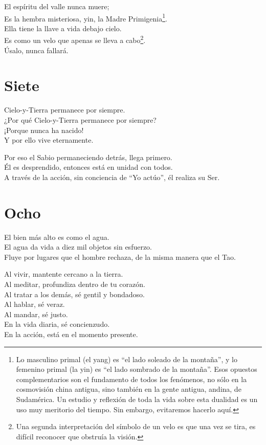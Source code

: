 \documentclass[book,b5paper,hidelinks,final]{memoir}
\begin{document}
	El espíritu del valle nunca muere;\\
	Es la hembra misteriosa, yin, la Madre Primigenia\footnote{Lo masculino primal (el yang) es ``el lado soleado de la montaña'', y lo
		femenino primal (la yin) es ``el lado sombrado de la montaña''. Esos
		opuestos complementarios son el fundamento de todos los fenómenos, no
		sólo en la cosmovisión china antigua, sino también en la gente antigua,
		andina, de Sudamérica. Un estudio y reflexión de toda la vida sobre esta
		dualidad es un uso muy meritorio del tiempo. Sin embargo, evitaremos
		hacerlo aquí.}.\\
	Ella tiene la llave a vida debajo cielo.\\
	Es como un velo que apenas se lleva a cabo\footnote{Una segunda interpretación del símbolo de un velo es que una vez se tira, es difícil reconocer que obstruía la visión.}.\\
	Úsalo, nunca fallará.
	
	\chapter*{Siete}
	
	Cielo-y-Tierra permanece por siempre.\\
	¿Por qué Cielo-y-Tierra permanece por siempre?\\
	¡Porque nunca ha nacido!\\
	Y por ello vive eternamente.
	
	Por eso el Sabio permaneciendo detrás, llega primero.\\
	Él es desprendido, entonces está en unidad con todos.\\
	A través de la acción, sin conciencia de ``Yo actúo'', él realiza su
	Ser.
	
	\chapter*{Ocho}
	
	El bien más alto es como el agua.\\
	El agua da vida a diez mil objetos sin esfuerzo.\\
	Fluye por lugares que el hombre rechaza, de la misma manera que el Tao.
	
	Al vivir, mantente cercano a la tierra.\\
	Al meditar, profundiza dentro de tu corazón.\\
	Al tratar a los demás, sé gentil y bondadoso.\\
	Al hablar, sé veraz.\\
	Al mandar, sé justo.\\
	En la vida diaria, sé concienzudo.\\
	En la acción, está en el momento presente.
	
\end{document}
